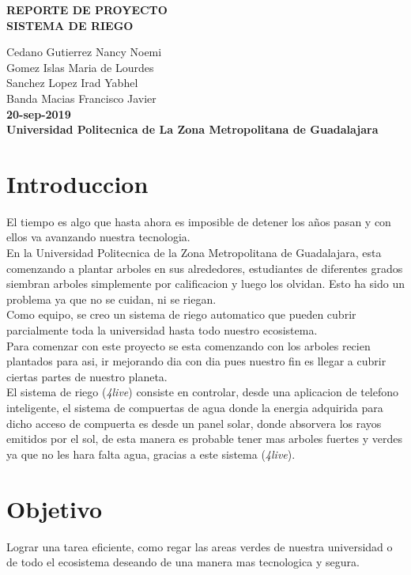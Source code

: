 \documentclass[11pt,a4paper]{article}
\begin{document}
\begin{center}
\textbf{REPORTE DE PROYECTO}\\
\textbf{SISTEMA DE RIEGO}
\end{center}

\begin{center}
Cedano Gutierrez Nancy Noemi\\
Gomez Islas Maria de Lourdes\\
Sanchez Lopez Irad Yabhel\\
Banda Macias Francisco Javier\\
\textbf{20-sep-2019}\\
\textbf{Universidad Politecnica de La Zona Metropolitana de Guadalajara}
\end{center}

\section{Introduccion}
El tiempo es algo que hasta ahora es imposible de detener los años pasan y con ellos va avanzando nuestra tecnologia.\\
En la Universidad Politecnica de la Zona Metropolitana de Guadalajara, esta comenzando a plantar arboles en sus alrededores, estudiantes de diferentes grados siembran arboles simplemente por calificacion y luego los olvidan. Esto ha sido un problema ya que no se cuidan, ni se riegan.\\
Como equipo, se creo un sistema de riego automatico que pueden cubrir parcialmente toda la universidad hasta todo nuestro ecosistema.\\
Para comenzar con este proyecto se esta comenzando con los arboles recien plantados para asi, ir mejorando dia con dia pues nuestro fin es llegar a cubrir ciertas partes de nuestro planeta.\\
El sistema de riego (\emph{4live}) consiste en controlar, desde una aplicacion de telefono inteligente, el sistema de compuertas de agua donde la energia adquirida para dicho acceso de compuerta es desde un panel solar, donde absorvera los rayos emitidos por el sol, de esta manera es probable tener mas arboles fuertes y verdes ya que no les hara falta agua, gracias a este sistema (\emph{4live}).

\section{Objetivo}
Lograr una tarea eficiente, como regar las areas verdes de nuestra universidad o de todo el ecosistema deseando de una manera mas tecnologica y segura.
\end{document}
